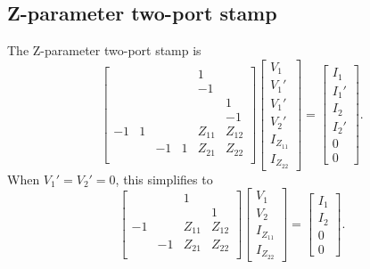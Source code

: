 \documentclass[a4paper, 12pt]{article}
\begin{document}
\subsection{Z-parameter two-port stamp}

The Z-parameter two-port stamp is
%
\begin{equation}
  \begin{bmatrix}
   &   &   &   &  1 &    \\
   &   &   &   & -1 &    \\
   &   &   &   &    &  1 \\
   &   &   &   &    &  -1 \\
   -1& 1 &   &    & Z_{11} & Z_{12} \\
    &   & -1 & 1 & Z_{21} & Z_{22} \\
  \end{bmatrix}
  \begin{bmatrix}
    V_1 \\ V_1' \\ V_1' \\ V_2' \\ I_{Z_{11}} \\ I_{Z_{22}}
  \end{bmatrix}
=
\begin{bmatrix}
  I_1 \\ I_1' \\ I_2 \\ I_2' \\ 0 \\ 0
\end{bmatrix}.
\end{equation}
%
When $V_1' = V_2' = 0$, this simplifies to
%
\begin{equation}
  \begin{bmatrix}
      & & 1 &   \\
      & &   & 1 \\
    -1 &   & Z_{11} & Z_{12} \\
      & -1 & Z_{21} & Z_{22} \\
  \end{bmatrix}
  \begin{bmatrix}
    V_1 \\ V_2 \\ I_{Z_{11}} \\ I_{Z_{22}}
  \end{bmatrix}
=
\begin{bmatrix}
  I_1 \\ I_2 \\ 0 \\ 0
\end{bmatrix}.
\end{equation}
%
\end{document}
